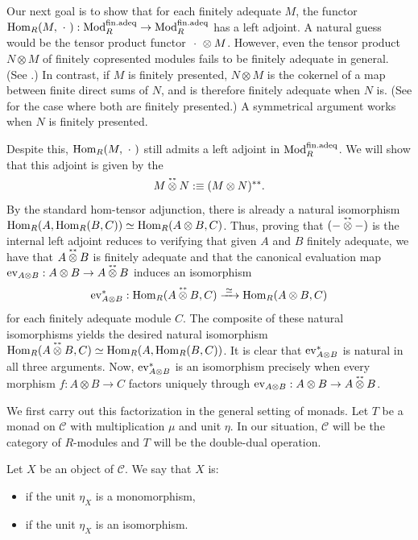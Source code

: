 Our next goal is to show that for each finitely adequate $M$, the functor $\mathrm{Hom}_R(M, \ \cdot\ ) : \textup{Mod}_{R}^{\mathrm{fin.adeq}} \to \textup{Mod}_{R}^{\mathrm{fin.adeq}}$
has a left adjoint.
A natural guess would be the tensor product functor $\ \cdot\  \otimes M$.
However, even the tensor product $N \otimes M$ of finitely copresented modules fails to be finitely adequate in general.  (See .)
In contrast, if $M$ is finitely presented, $N \otimes M$ is the cokernel of a map between finite direct sums of $N$, and is therefore finitely adequate when $N$ is. (See  for the case where both are finitely presented.)
A symmetrical argument works when $N$ is finitely presented.

Despite this, $\mathrm{Hom}_R(M, \ \cdot\ )$ still admits a left adjoint in $\textup{Mod}_{R}^{\mathrm{fin.adeq}}$.
We will show that this adjoint is given by the 
\[
  M \dbldualtensor N \defeq (M \otimes N)^{\ast\ast}.
\]
By the standard hom-tensor adjunction, there is already a natural isomorphism $\mathrm{Hom}_R(A, \mathrm{Hom}_R(B, C)) \simeq \mathrm{Hom}_R(A \otimes B, C)$.
Thus, proving that $(-\dbldualtensor-)$ is the internal left adjoint reduces to verifying that given $A$ and $B$ finitely adequate, we have that $A\dbldualtensor B$ is finitely adequate and that the canonical evaluation map $\ev_{A \otimes B} : A \otimes B \to A \dbldualtensor B$ induces an isomorphism
\[
  \ev_{A \otimes B}^\ast : \Hom_R(A \dbldualtensor B, C) \xrightarrow{\;\simeq\;} \Hom_R(A \otimes B, C)
\]
for each finitely adequate module $C$.
The composite of these natural isomorphisms yields the desired natural isomorphism $\Hom_R(A \dbldualtensor B, C) \simeq \Hom_R(A, \Hom_R(B, C))$.
It is clear that $\mathrm{ev}_{A \otimes B}^\ast$ is natural in all three arguments.
Now, $\mathrm{ev}_{A \otimes B}^\ast$ is an isomorphism precisely when every morphism $f : A \otimes B \to C$ factors uniquely through $\ev_{A \otimes B} : A \otimes B \to A \dbldualtensor B$.

We first carry out this factorization in the general setting of monads.
Let $T$ be a monad on $\mathcal{C}$ with multiplication $\mu$ and unit $\eta$.
In our situation, $\mathcal{C}$ will be the category of $R$-modules and $T$
will be the double-dual operation.

\begin{definition}\label{def:monad-reflexive}
  Let $X$ be an object of $\mathcal{C}$. We say that $X$ is:
  \begin{itemize}
    \item {} if the unit $\eta_X$ is a monomorphism,
    \item {} if the unit $\eta_X$ is an isomorphism.
  \end{itemize}
\end{definition}

